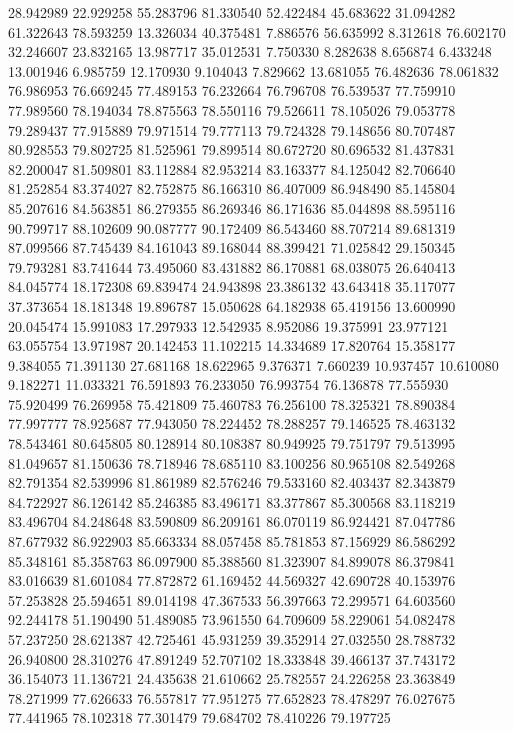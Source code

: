 28.942989
22.929258
55.283796
81.330540
52.422484
45.683622
31.094282
61.322643
78.593259
13.326034
40.375481
7.886576
56.635992
8.312618
76.602170
32.246607
23.832165
13.987717
35.012531
7.750330
8.282638
8.656874
6.433248
13.001946
6.985759
12.170930
9.104043
7.829662
13.681055
76.482636
78.061832
76.986953
76.669245
77.489153
76.232664
76.796708
76.539537
77.759910
77.989560
78.194034
78.875563
78.550116
79.526611
78.105026
79.053778
79.289437
77.915889
79.971514
79.777113
79.724328
79.148656
80.707487
80.928553
79.802725
81.525961
79.899514
80.672720
80.696532
81.437831
82.200047
81.509801
83.112884
82.953214
83.163377
84.125042
82.706640
81.252854
83.374027
82.752875
86.166310
86.407009
86.948490
85.145804
85.207616
84.563851
86.279355
86.269346
86.171636
85.044898
88.595116
90.799717
88.102609
90.087777
90.172409
86.543460
88.707214
89.681319
87.099566
87.745439
84.161043
89.168044
88.399421
71.025842
29.150345
79.793281
83.741644
73.495060
83.431882
86.170881
68.038075
26.640413
84.045774
18.172308
69.839474
24.943898
23.386132
43.643418
35.117077
37.373654
18.181348
19.896787
15.050628
64.182938
65.419156
13.600990
20.045474
15.991083
17.297933
12.542935
8.952086
19.375991
23.977121
63.055754
13.971987
20.142453
11.102215
14.334689
17.820764
15.358177
9.384055
71.391130
27.681168
18.622965
9.376371
7.660239
10.937457
10.610080
9.182271
11.033321
76.591893
76.233050
76.993754
76.136878
77.555930
75.920499
76.269958
75.421809
75.460783
76.256100
78.325321
78.890384
77.997777
78.925687
77.943050
78.224452
78.288257
79.146525
78.463132
78.543461
80.645805
80.128914
80.108387
80.949925
79.751797
79.513995
81.049657
81.150636
78.718946
78.685110
83.100256
80.965108
82.549268
82.791354
82.539996
81.861989
82.576246
79.533160
82.403437
82.343879
84.722927
86.126142
85.246385
83.496171
83.377867
85.300568
83.118219
83.496704
84.248648
83.590809
86.209161
86.070119
86.924421
87.047786
87.677932
86.922903
85.663334
88.057458
85.781853
87.156929
86.586292
85.348161
85.358763
86.097900
85.388560
81.323907
84.899078
86.379841
83.016639
81.601084
77.872872
61.169452
44.569327
42.690728
40.153976
57.253828
25.594651
89.014198
47.367533
56.397663
72.299571
64.603560
92.244178
51.190490
51.489085
73.961550
64.709609
58.229061
54.082478
57.237250
28.621387
42.725461
45.931259
39.352914
27.032550
28.788732
26.940800
28.310276
47.891249
52.707102
18.333848
39.466137
37.743172
36.154073
11.136721
24.435638
21.610662
25.782557
24.226258
23.363849
78.271999
77.626633
76.557817
77.951275
77.652823
78.478297
76.027675
77.441965
78.102318
77.301479
79.684702
78.410226
79.197725
